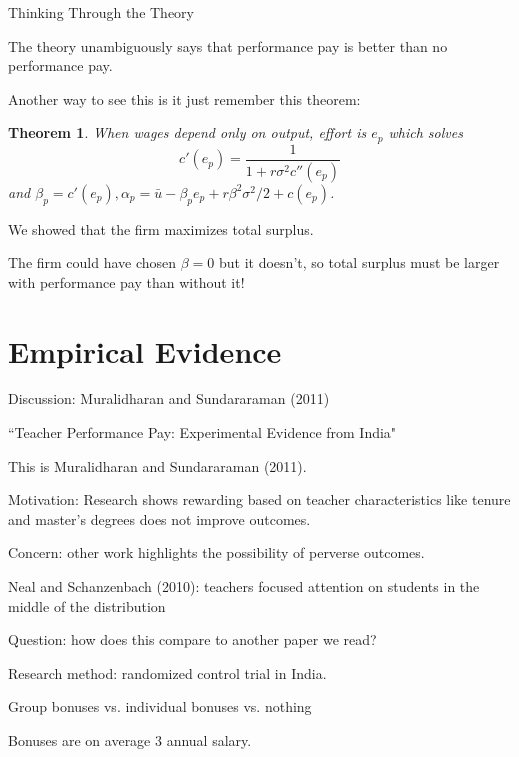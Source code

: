 \documentclass[aspectratio=169,usenames,dvipsnames]{beamer}
\newenvironment{wideitemize}{\itemize\addtolength{\itemsep}{10pt}}{\enditemize}
\newtheorem*{theorem*}{Theorem}
\begin{document}
\begin{frame}{Thinking Through the Theory}

\begin{wideitemize}
    \item The theory unambiguously says that performance pay is better than no performance pay.
     \item Another way to see this is it just remember this theorem:
    \begin{theorem*}
        When wages depend only on output, effort is $e_{p}$ which solves 
        \[c'(e_{p})= \frac{1}{1+r \sigma^2 c''(e_{p})}\]
        and $\beta_{p} =c'(e_{p}),\alpha_{p} =\bar u - \beta_{p} e_{p}+r \beta^2\sigma^2/2+c(e_{p})$.
    \end{theorem*}
\item  We showed that the firm maximizes total surplus.
\item The firm could have chosen $\beta=0$ but it doesn't, so total surplus must be larger with performance pay than without it!
\end{wideitemize}
\end{frame}

\section{Empirical Evidence}


\begin{frame}
\centering
    \huge Discussion: Muralidharan and Sundararaman (2011)
\end{frame}

\begin{frame}{``Teacher Performance Pay: Experimental Evidence from India"}
    \begin{wideitemize}
        \item This is Muralidharan and Sundararaman (2011).
        \item Motivation: Research shows rewarding based on teacher characteristics like tenure and master's degrees does not improve outcomes.
        \item Concern: other work highlights the possibility of perverse outcomes.
        \begin{wideitemize}
            \item Neal and Schanzenbach (2010): teachers focused attention on students in the middle of the distribution
            \item Question: how does this compare to another paper we read?
        \end{wideitemize}
        \item Research method: randomized control trial in India.
        \item Group bonuses vs. individual bonuses vs. nothing
        \item Bonuses are on average 3 annual salary.
    \end{wideitemize}
\end{frame}
\end{document}
